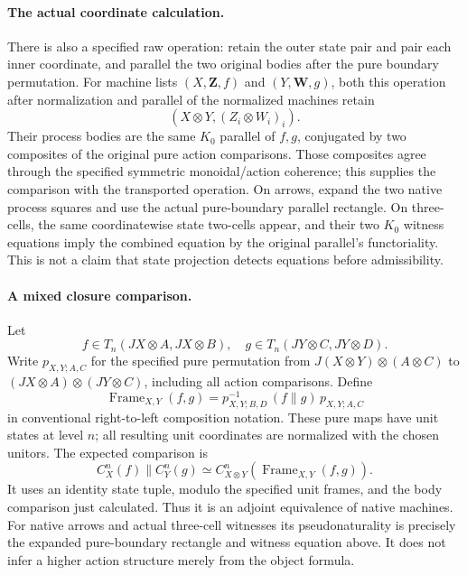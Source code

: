 \documentclass{article}
\begin{document}
\paragraph{The actual coordinate calculation.} There is also a specified raw operation: retain the outer state pair and pair each inner coordinate, and parallel the two original bodies after the pure boundary permutation. For machine lists $(X,\mathbf Z,f)$ and $(Y,\mathbf W,g)$, both this operation after normalization and parallel of the normalized machines retain
\[
 (X\otimes Y,(Z_i\otimes W_i)_i).
\]
Their process bodies are the same $K_0$ parallel of $f,g$, conjugated by two composites of the original pure action comparisons. Those composites agree through the specified symmetric monoidal/action coherence; this supplies the comparison with the transported operation. On arrows, expand the two native process squares and use the actual pure-boundary parallel rectangle. On three-cells, the same coordinatewise state two-cells appear, and their two $K_0$ witness equations imply the combined equation by the original parallel's functoriality. This is not a claim that state projection detects equations before admissibility.

\paragraph{A mixed closure comparison.} Let
\[
 f\in T_n(JX\otimes A,JX\otimes B),\quad
 g\in T_n(JY\otimes C,JY\otimes D).
\]
Write $p_{X,Y;A,C}$ for the specified pure permutation from
$J(X\otimes Y)\otimes(A\otimes C)$ to
$(JX\otimes A)\otimes(JY\otimes C)$, including all action comparisons. Define
\[
 \operatorname{Frame}_{X,Y}(f,g)
 =p_{X,Y;B,D}^{-1}\,(f\parallel g)\,p_{X,Y;A,C}
\]
in conventional right-to-left composition notation. These pure maps have unit states at level $n$; all resulting unit coordinates are normalized with the chosen unitors. The expected comparison is
\[
 C_X^n(f)\parallel C_Y^n(g)
 \simeq C_{X\otimes Y}^n(\operatorname{Frame}_{X,Y}(f,g)).
\]
It uses an identity state tuple, modulo the specified unit frames, and the body comparison just calculated. Thus it is an adjoint equivalence of native machines. For native arrows and actual three-cell witnesses its pseudonaturality is precisely the expanded pure-boundary rectangle and witness equation above. It does not infer a higher action structure merely from the object formula.
\end{document}

